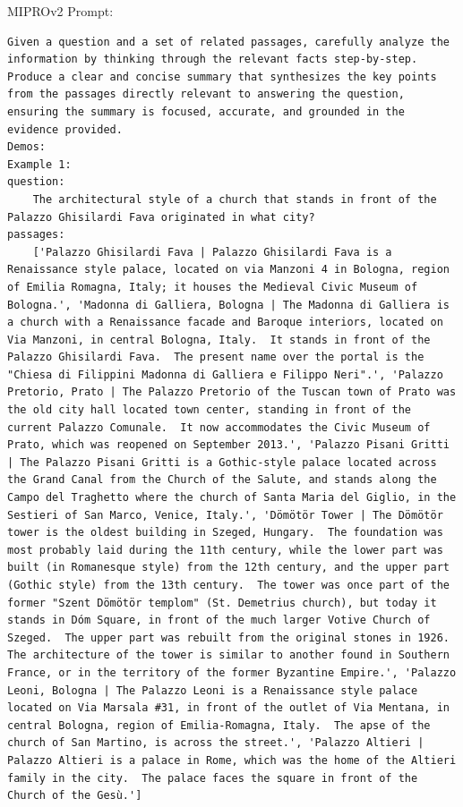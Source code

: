 \begin{instructbox}
MIPROv2 Prompt:
\begin{lstlisting}[breakindent=0pt, breaklines=true, breakatwhitespace=true, frame=single, backgroundcolor=\color{green!10}]
Given a question and a set of related passages, carefully analyze the information by thinking through the relevant facts step-by-step. Produce a clear and concise summary that synthesizes the key points from the passages directly relevant to answering the question, ensuring the summary is focused, accurate, and grounded in the evidence provided.
Demos:
Example 1:
question:
    The architectural style of a church that stands in front of the Palazzo Ghisilardi Fava originated in what city?
passages:
    ['Palazzo Ghisilardi Fava | Palazzo Ghisilardi Fava is a Renaissance style palace, located on via Manzoni 4 in Bologna, region of Emilia Romagna, Italy; it houses the Medieval Civic Museum of Bologna.', 'Madonna di Galliera, Bologna | The Madonna di Galliera is a church with a Renaissance facade and Baroque interiors, located on Via Manzoni, in central Bologna, Italy.  It stands in front of the Palazzo Ghisilardi Fava.  The present name over the portal is the "Chiesa di Filippini Madonna di Galliera e Filippo Neri".', 'Palazzo Pretorio, Prato | The Palazzo Pretorio of the Tuscan town of Prato was the old city hall located town center, standing in front of the current Palazzo Comunale.  It now accommodates the Civic Museum of Prato, which was reopened on September 2013.', 'Palazzo Pisani Gritti | The Palazzo Pisani Gritti is a Gothic-style palace located across the Grand Canal from the Church of the Salute, and stands along the Campo del Traghetto where the church of Santa Maria del Giglio, in the Sestieri of San Marco, Venice, Italy.', 'Dömötör Tower | The Dömötör tower is the oldest building in Szeged, Hungary.  The foundation was most probably laid during the 11th century, while the lower part was built (in Romanesque style) from the 12th century, and the upper part (Gothic style) from the 13th century.  The tower was once part of the former "Szent Dömötör templom" (St. Demetrius church), but today it stands in Dóm Square, in front of the much larger Votive Church of Szeged.  The upper part was rebuilt from the original stones in 1926.  The architecture of the tower is similar to another found in Southern France, or in the territory of the former Byzantine Empire.', 'Palazzo Leoni, Bologna | The Palazzo Leoni is a Renaissance style palace located on Via Marsala #31, in front of the outlet of Via Mentana, in central Bologna, region of Emilia-Romagna, Italy.  The apse of the church of San Martino, is across the street.', 'Palazzo Altieri | Palazzo Altieri is a palace in Rome, which was the home of the Altieri family in the city.  The palace faces the square in front of the Church of the Gesù.']

\end{lstlisting}
\end{instructbox}
